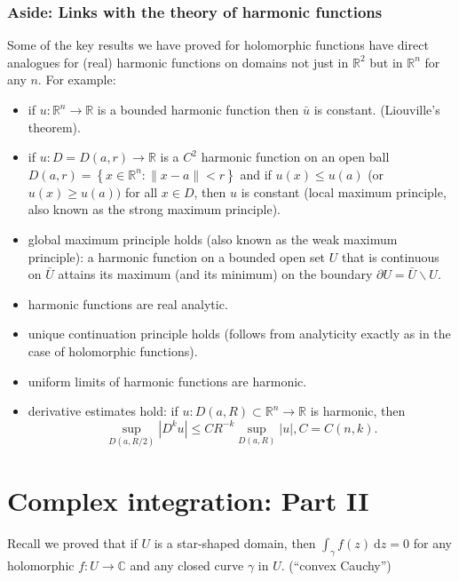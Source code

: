 \documentclass[egregdoesnotlikesansseriftitles,a4paper]{scrartcl}
\begin{document}
\subsubsection*{Aside: Links with the theory of harmonic functions}
Some of the key results we have proved for holomorphic functions have direct analogues for (real) harmonic functions on domains not just in $\mathbb{R}^{2}$ but in $\mathbb{R}^{n}$ for any $n$. For example:
\begin{itemize}
     \item if $u: \mathbb{R}^{n} \rightarrow \mathbb{R}$ is a bounded harmonic function then $\bar{u}$ is constant. (Liouville's theorem).
     \item if $u: D=D(a, r) \rightarrow \mathbb{R}$ is a $C^{2}$ harmonic function on an open ball $D(a, r)=\left\{x \in \mathbb{R}^{n}:\|x-a\|<r\right\}$ and if $u(x) \leq u(a)$ (or $u(x) \geq u(a))$ for all $x \in D$, then $u$ is constant (local maximum principle, also known as the strong maximum principle).
     \item global maximum principle holds (also known as the weak maximum principle): a harmonic function on a bounded open set $U$ that is continuous on $\bar{U}$ attains its maximum (and its minimum) on the boundary $\partial U=\bar{U} \backslash U$.
     \item harmonic functions are real analytic.
     \item unique continuation principle holds (follows from analyticity exactly as in the case of holomorphic functions).
     \item uniform limits of harmonic functions are harmonic.
     \item derivative estimates hold: if $u: D(a, R) \subset \mathbb{R}^{n} \rightarrow \mathbb{R}$ is harmonic, then \[
          \sup _{D(a, R / 2)}\left|D^{k} u\right| \leq C R^{-k} \sup _{D(a, R)}|u|, C=C(n, k)
     .\] 
\end{itemize}
\newpage
\section{Complex integration: Part II}
Recall we proved that if $U$ is a star-shaped domain, then $\int_{\gamma}^{}f (z) \ \mathrm{d}z=0 $ for any holomorphic $f: U \rightarrow \mathbb{C}$ and any closed curve $\gamma$ in $U$. (``convex Cauchy'')
\end{document}
